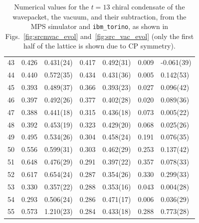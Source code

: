 \documentclass[aps, prc, tightenlines,superscriptaddress, letterpaper, amsmath, amssymb, preprintnumbers, floatfix, longbibliography, nofootinbib]{revtex4-2}
\begin{document}
\begin{table}[!htb]
{\begin{tabularx}{\textwidth}{| c || Y | Y | Y | Y | Y | Y |}
43	&	0.426	&	0.431(24)	&	0.417	&	0.492(31)	&	0.009	&	-0.061(39)	\\
44	&	0.440	&	0.572(35)	&	0.434	&	0.431(36)	&	0.005	&	0.142(53)	\\
45	&	0.393	&	0.489(37)	&	0.366	&	0.393(23)	&	0.027	&	0.096(42)	\\
46	&	0.397	&	0.492(26)	&	0.377	&	0.402(28)	&	0.020	&	0.089(36)	\\
47	&	0.388	&	0.441(18)	&	0.315	&	0.436(18)	&	0.073	&	0.005(22)	\\
48	&	0.392	&	0.453(19)	&	0.323	&	0.429(20)	&	0.068	&	0.025(26)	\\
49	&	0.495	&	0.534(26)	&	0.304	&	0.458(24)	&	0.191	&	0.076(35)	\\
50	&	0.556	&	0.599(31)	&	0.303	&	0.462(29)	&	0.253	&	0.137(42)	\\
51	&	0.648	&	0.476(29)	&	0.291	&	0.397(22)	&	0.357	&	0.078(33)	\\
52	&	0.617	&	0.654(24)	&	0.287	&	0.354(26)	&	0.330	&	0.299(33)	\\
53	&	0.330	&	0.357(22)	&	0.288	&	0.353(16)	&	0.043	&	0.004(28)	\\
54	&	0.293	&	0.506(24)	&	0.286	&	0.471(17)	&	0.006	&	0.036(29)	\\
55	&	0.573	&	1.210(23)	&	0.284	&	0.433(18)	&	0.288	&	0.773(28)	\\ \hline
\end{tabularx}}
\caption{Numerical values for the $t=13$ chiral condensate of the wavepacket, the vacuum, and their subtraction, from the MPS simulator and {\tt ibm\_torino}, as shown in Figs.~\ref{fig:srcmvac_evol} and~\ref{fig:src_vac_evol} (only the first half of the lattice is shown due to CP symmetry).}
 \label{tab:tablet13}
\end{table}
%
\end{document}
